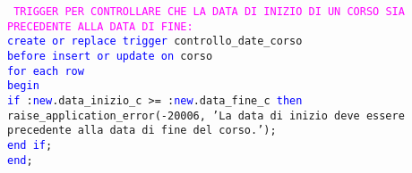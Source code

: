 \documentclass{article}
\begin{document}
    \begin{flushleft}
        \texttt{
        \textcolor{magenta}{TRIGGER PER CONTROLLARE CHE LA DATA DI INIZIO DI UN CORSO SIA PRECEDENTE ALLA \hspace*{0.5em}DATA DI FINE:} \\
        \hspace*{2em} \textcolor{blue}{create or replace trigger} controllo\_date\_corso \\
        \hspace*{2em} \textcolor{blue}{before insert or update on} corso \\
        \hspace*{2em} \textcolor{blue}{for each row} \\
        \hspace*{2em} \textcolor{blue}{begin} \\
        \hspace*{4.4em}\textcolor{blue}{if} :\textcolor{blue}{new}.data\_inizio\_c >= :\textcolor{blue}{new}.data\_fine\_c \textcolor{blue}{then} \hspace*{4.4em}raise\_application\_error(-20006, 'La data di inizio deve essere precedente \hspace*{4.4em}alla data di fine del corso.'); \\
        \hspace*{4em} \textcolor{blue}{end if}; \\
        \hspace*{2em} \textcolor{blue}{end}; \\}
    \end{flushleft}
\end{document}
